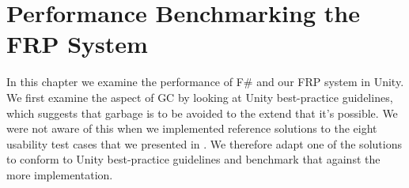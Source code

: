 \section{Performance Benchmarking the FRP System}
In this chapter we examine the performance of F\# and our \gls{FRP} system in Unity. We first examine the aspect of \gls{GC} by looking at Unity best-practice guidelines, which suggests that garbage is to be avoided to the extend that it's possible. We were not aware of this when we implemented reference solutions to the eight usability test cases that we presented in . We therefore adapt one of the solutions to conform to Unity best-practice guidelines and benchmark that against the more  implementation.


